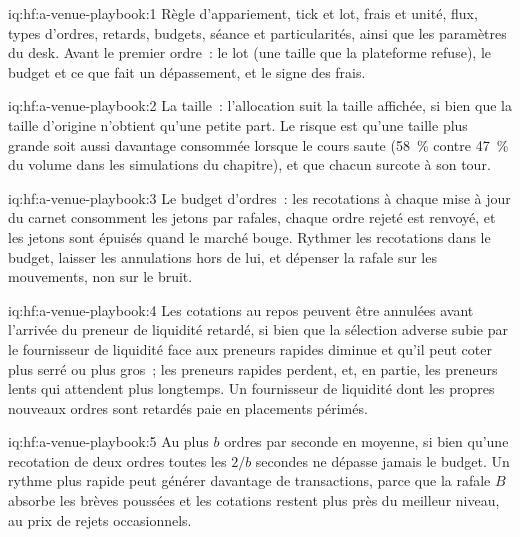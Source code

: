 \begin{solution}{iq:hf:a-venue-playbook:1}
Règle d'appariement, tick et lot, frais et unité, flux, types d'ordres, retards, budgets, séance et particularités, ainsi que les paramètres du desk. Avant le premier
ordre~: le lot (une taille que la plateforme refuse), le budget et ce que fait un dépassement, et le signe des frais.
\end{solution}

\begin{solution}{iq:hf:a-venue-playbook:2}
La taille~: l'allocation suit la taille affichée, si bien que la taille d'origine n'obtient qu'une petite part. Le risque est qu'une taille plus grande soit aussi davantage consommée lorsque
le cours saute (58~\% contre 47~\% du volume dans les simulations du chapitre), et que chacun surcote à son tour.
\end{solution}

\begin{solution}{iq:hf:a-venue-playbook:3}
Le budget d'ordres~: les recotations à chaque mise à jour du carnet consomment les jetons par rafales, chaque ordre rejeté est renvoyé, et les jetons sont épuisés quand le marché
bouge. Rythmer les recotations dans le budget, laisser les annulations hors de lui, et dépenser la rafale sur les mouvements, non sur le bruit.
\end{solution}

\begin{solution}{iq:hf:a-venue-playbook:4}
Les cotations au repos peuvent être annulées avant l'arrivée du preneur de liquidité retardé, si bien que la sélection adverse subie par le fournisseur de liquidité face aux preneurs rapides diminue et qu'il peut coter plus serré
ou plus gros~; les preneurs rapides perdent, et, en partie, les preneurs lents qui attendent plus longtemps. Un fournisseur de liquidité dont les propres nouveaux ordres sont retardés paie en placements périmés.
\end{solution}

\begin{solution}{iq:hf:a-venue-playbook:5}
Au plus $b$ ordres par seconde en moyenne, si bien qu'une recotation de deux ordres toutes les $2/b$ secondes ne dépasse jamais le budget. Un rythme plus rapide peut générer davantage de transactions, parce que la
rafale $B$ absorbe les brèves poussées et les cotations restent plus près du meilleur niveau, au prix de rejets occasionnels.
\end{solution}


